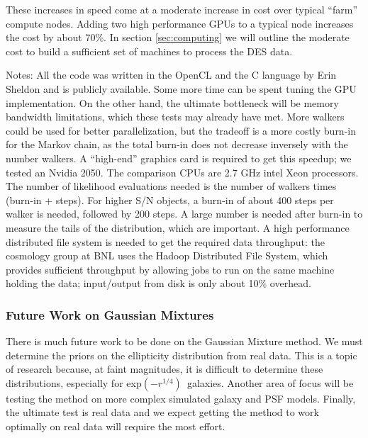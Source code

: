 \documentclass[12pt]{article}
\newcommand{\devprof}{exp$(-r^{1/4})$}
\begin{document}
These increases in speed come at a moderate increase in cost over typical
``farm'' compute nodes.  Adding two high performance GPUs to a typical node
increases the cost by about 70\%. In section \ref{sec:computing} we will
outline the moderate cost to build a sufficient set of machines to process the
DES data.

{\it
    
Notes:  All the code was written in the OpenCL and the C language by Erin
Sheldon and is publicly available.  Some more time can be spent tuning the GPU
implementation. On the other hand, the ultimate bottleneck will be memory
bandwidth limitations, which these tests may already have met.   More walkers
could be used for better parallelization, but the tradeoff is a more costly
burn-in for the Markov chain, as the total burn-in does not decrease inversely
with the number walkers.  A ``high-end'' graphics card is required to get this
speedup; we tested an Nvidia 2050. The comparison CPUs are 2.7 GHz intel Xeon
processors.  The number of likelihood evaluations needed is the number of
walkers times (burn-in + steps).  For higher S/N objects, a burn-in of about
400 steps per walker is needed, followed by 200 steps.  A large number is
needed after burn-in to measure the tails of the distribution, which are
important.  A high performance distributed file system is needed to get the
required data throughput: the cosmology group at BNL uses the Hadoop
Distributed File System, which provides sufficient throughput by allowing jobs
to run on the same machine holding the data; input/output from disk is only
about 10\% overhead.  }

\subsubsection{Future Work on Gaussian Mixtures}

There is much future work to be done on the Gaussian Mixture method.  We must
determine the priors on the ellipticity distribution from real data.  This is a
topic of research because, at faint magnitudes, it is difficult to determine
these distributions, especially for \devprof\ galaxies\cite{Miller12}.  Another
area of focus will be testing the method on more complex simulated galaxy and
PSF models.  Finally, the ultimate test is real data and we expect getting the
method to work optimally on real data will require the most effort.
\end{document}
